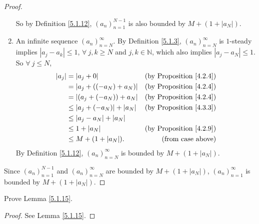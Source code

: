 \begin{proof}
\begin{enumerate}
    So by Definition \ref{5.1.12}, \((a_n)_{n = 1}^{N - 1}\) is also bounded by \(M + (1 + |a_N|)\).
    \item An infinite sequence \((a_n)_{n = N}^{\infty}\).
    By Definition \ref{5.1.3}, \((a_n)_{n = N}^{\infty}\) is \(1\)-steady implies \(|a_j - a_k| \leq 1\), \(\forall\ j, k \geq N\) and  \(j, k \in \mathds{N}\), which also implies \(|a_j - a_N| \leq 1\).
    So \(\forall\ j \leq N\),
    \begin{align*}
    |a_j| &= |a_j + 0| & \text{(by Proposition \ref{4.2.4})} \\
    &= |a_j + ((-a_N) + a_N)| & \text{(by Proposition \ref{4.2.4})} \\
    &= |(a_j + (-a_N)) + a_N| & \text{(by Proposition \ref{4.2.4})} \\
    &\leq |a_j + (-a_N)| + |a_N| & \text{(by Proposition \ref{4.3.3})} \\
    &\leq |a_j - a_N| + |a_N| \\
    &\leq 1 + |a_N| & \text{(by Proposition \ref{4.2.9})} \\
    &\leq M + (1 + |a_N|). & \text{(from case above)}
    \end{align*}
    By Definition \ref{5.1.12}, \((a_n)_{n = N}^{\infty}\) is bounded by \(M + (1 + |a_N|)\).
\end{enumerate}
Since \((a_n)_{n = 1}^{N - 1}\) and \((a_n)_{n = N}^{\infty}\) are bounded by \(M + (1 + |a_N|)\), \((a_n)_{n = 1}^{\infty}\) is bounded by \(M + (1 + |a_N|)\).
\end{proof}

\exercisesection

\begin{exercise}\label{ex 5.1.1}
Prove Lemma \ref{5.1.15}.
\end{exercise}

\begin{proof}
See Lemma \ref{5.1.15}.
\end{proof}
